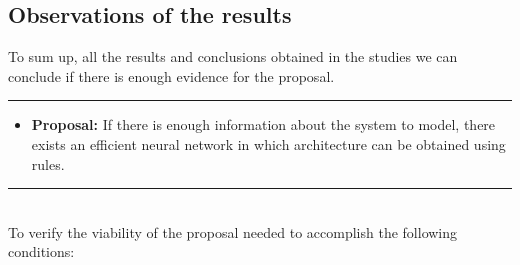 \documentclass[a4paper, 11pt]{article}
\begin{document}
\subsection{Observations of the results}
To sum up, all the results and conclusions obtained in the studies we can conclude if there is enough evidence for the proposal.\\
\rule{\linewidth}{0.4pt}
\begin{itemize}
    \item \textbf{Proposal:} If there is enough information about the system to model, there exists an efficient neural network in which architecture can be obtained using rules.
\end{itemize}
\rule{\linewidth}{0.4pt}\\ \vspace{0.5em}
To verify the viability of the proposal needed to accomplish the following conditions:
\newpage
\end{document}

